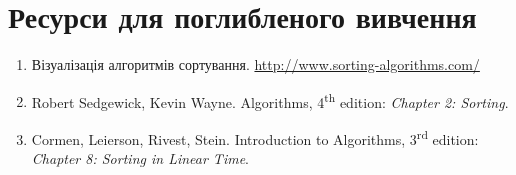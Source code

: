 \documentclass[12pt,a4paper]{report}
\begin{document}
\section*{Ресурси для поглибленого вивчення}
\begin{enumerate}
    \item Візуалізація алгоритмів сортування. \href{http://www.sorting-algorithms.com/}{http://www.sorting-algorithms.com/}
    \item Robert Sedgewick, Kevin Wayne. Algorithms, 4\textsuperscript{th} edition: {\itshape Chapter 2: Sorting}.
    \item Cormen, Leierson, Rivest, Stein. Introduction to Algorithms, 3\textsuperscript{rd} edition: {\itshape Chapter 8: Sorting in Linear Time}.
\end{enumerate}
\end{document}
